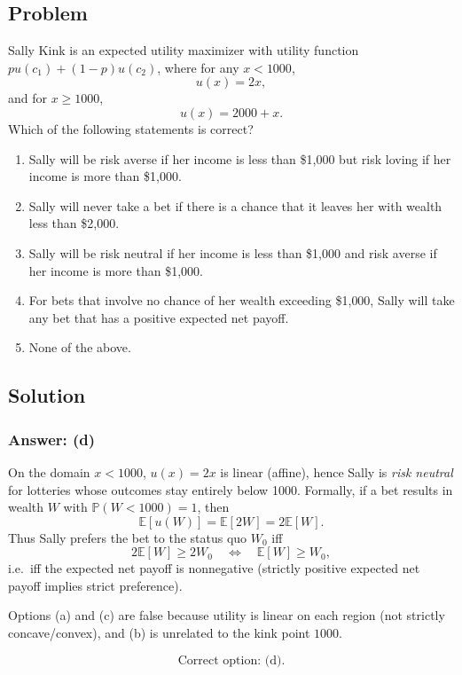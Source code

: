 \documentclass[12pt]{article}
\begin{document}
\subsection*{Problem}
Sally Kink is an expected utility maximizer with utility function \(p u(c_1)+(1-p)u(c_2)\), where for any \(x<1000\),
\[
u(x)=2x,
\]
and for \(x\ge 1000\),
\[
u(x)=2000+x.
\]
Which of the following statements is correct?
\begin{enumerate}[label=(\alph*), leftmargin=*]
\item Sally will be risk averse if her income is less than \$1{,}000 but risk loving if her income is more than \$1{,}000.
\item Sally will never take a bet if there is a chance that it leaves her with wealth less than \$2{,}000.
\item Sally will be risk neutral if her income is less than \$1{,}000 and risk averse if her income is more than \$1{,}000.
\item For bets that involve no chance of her wealth exceeding \$1{,}000, Sally will take any bet that has a positive expected net payoff.
\item None of the above.
\end{enumerate}

\subsection*{Solution}
\subsubsection*{Answer: (d)}
On the domain \(x<1000\), \(u(x)=2x\) is linear (affine), hence Sally is \emph{risk neutral} for lotteries whose outcomes stay entirely below 1000.
Formally, if a bet results in wealth \(W\) with \(\mathbb{P}(W<1000)=1\), then
\[
\mathbb{E}[u(W)] = \mathbb{E}[2W]=2\mathbb{E}[W].
\]
Thus Sally prefers the bet to the status quo \(W_0\) iff
\[
2\mathbb{E}[W] \ge 2W_0
\quad\Longleftrightarrow\quad
\mathbb{E}[W]\ge W_0,
\]
i.e.\ iff the expected net payoff is nonnegative (strictly positive expected net payoff implies strict preference).

Options (a) and (c) are false because utility is linear on each region (not strictly concave/convex), and (b) is unrelated to the kink point \(1000\).

\[
\boxed{\text{Correct option: (d).}}
\]

\newpage
\end{document}

